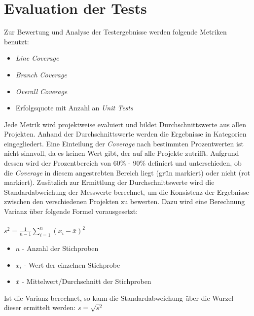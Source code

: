 \section{Evaluation der Tests}\label{section:eval}
Zur Bewertung und Analyse der Testergebnisse werden folgende Metriken benutzt:
\begin{itemize}
    \setlength{\parskip}{1pt}
    \item \textit{Line Coverage}
    \item \textit{Branch Coverage}
    \item \textit{Overall Coverage}
    \item Erfolgsquote mit Anzahl an \textit{Unit Tests}
\end{itemize}
Jede Metrik wird projektweise evaluiert und bildet Durchschnittswerte aus allen Projekten. Anhand der Durchschnittswerte werden die Ergebnisse in Kategorien eingegliedert. Eine Einteilung der \textit{Coverage} nach bestimmten Prozentwerten ist nicht sinnvoll, da es keinen Wert gibt, der auf alle Projekte zutrifft. Aufgrund dessen wird der Prozentbereich von 60\% - 90\% definiert und unterschieden, ob die \textit{Coverage} in diesem angestrebten Bereich liegt (grün markiert) oder nicht (rot markiert). \cite{WhatReasonableCode} Zusätzlich zur Ermittlung der Durchschnittswerte wird die Standardabweichung der Messwerte berechnet, um die Konsistenz der Ergebnisse zwischen den verschiedenen Projekten zu bewerten. Dazu wird eine Berechnung  Varianz über folgende Formel vorausgesetzt:\\\\
$s^2 = \frac{1}{n-1} \displaystyle\sum_{i=1}^{n} (x_i - \bar{x})^2$
\begin{itemize}
    \setlength{\parskip}{1pt}
    \item $n$ - Anzahl der Stichproben
    \item $x_i$ - Wert der einzelnen Stichprobe
    \item $\bar{x}$ - Mittelwert/Durchschnitt der Stichproben
\end{itemize}
Ist die Varianz berechnet, so kann die Standardabweichung über die Wurzel dieser ermittelt werden:
$s=\sqrt{s^2}$


